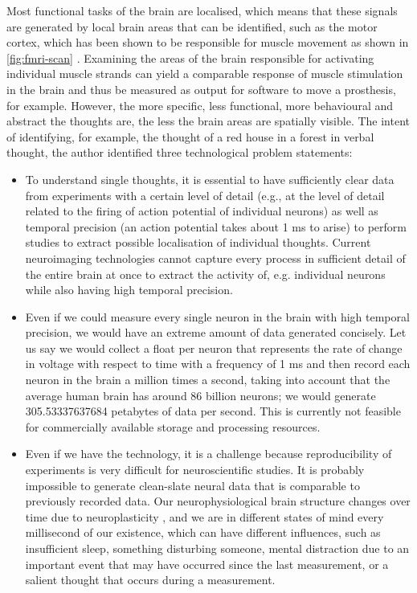 Most functional tasks of the brain are localised, which means that these signals are generated by local brain areas that can be identified, such as the motor cortex, which has been shown to be responsible for muscle movement as shown in \autoref{fig:fmri-scan} \citep{rashid_bilateral_2018}. Examining the areas of the brain responsible for activating individual muscle strands can yield a comparable response of muscle stimulation in the brain and thus be measured as output for software to move a prosthesis, for example. However, the more specific, less functional, more behavioural and abstract the thoughts are, the less the brain areas are spatially visible. The intent of identifying, for example, the thought of a red house in a forest in verbal thought, the author identified three technological problem statements:

\begin{itemize}
  \item To understand single thoughts, it is essential to have sufficiently clear data from experiments with a certain level of detail (e.g., at the level of detail related to the firing of action potential of individual neurons) as well as temporal precision (an action potential takes about 1 ms to arise) to perform studies to extract possible localisation of individual thoughts. Current neuroimaging technologies cannot capture every process in sufficient detail of the entire brain at once to extract the activity of, e.g. individual neurons while also having high temporal precision.
  \item Even if we could measure every single neuron in the brain with high temporal precision, we would have an extreme amount of data generated concisely. Let us say we would collect a float per neuron that represents the rate of change in voltage with respect to time with a frequency of 1 ms and then record each neuron in the brain a million times a second, taking into account that the average human brain has around 86 billion neurons; we would generate 305.53337637684 petabytes of data per second. This is currently not feasible for commercially available storage and processing resources.
  \item Even if we have the technology, it is a challenge because reproducibility of experiments is very difficult for neuroscientific studies. It is probably impossible to generate clean-slate neural data that is comparable to previously recorded data. Our neurophysiological brain structure changes over time due to neuroplasticity \citep{puderbaugh_neuroplasticity_2022}, and we are in different states of mind every millisecond of our existence, which can have different influences, such as insufficient sleep, something disturbing someone, mental distraction due to an important event that may have occurred since the last measurement, or a salient thought that occurs during a measurement.
\end{itemize}

